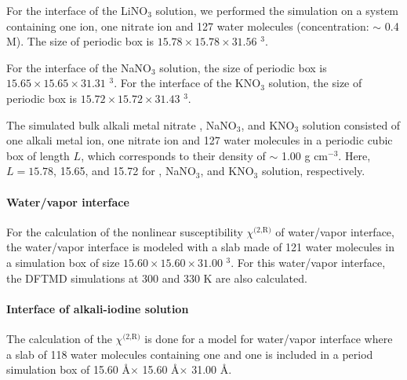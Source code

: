 For the interface of the LiNO$_3$ solution, we performed the simulation on a system containing one \Li ion, one nitrate ion 
and 127 water molecules (concentration: $\sim$ 0.4 M). 
The size of periodic box is $15.78 \times 15.78 \times 31.56$ \A$^3$.

For the interface of the NaNO$_3$ solution, the size of periodic box is $15.65 \times 15.65 \times 31.31$ \A$^3$. %
For the interface of the KNO$_3$ solution, the size of periodic box is $15.72 \times 15.72 \times 31.43$ \A$^3$. %

The simulated bulk alkali metal nitrate \LiN, NaNO$_3$, and KNO$_3$ solution consisted of one alkali metal ion, 
one nitrate ion and 127 water molecules in a periodic cubic box of length $L$, which corresponds to their density of $\sim$ 1.00 g cm$^{-3}$. 
Here, $L=15.78$, 15.65, and 15.72 for \LiN, NaNO$_3$, and KNO$_3$ solution, respectively.


\paragraph{Water/vapor interface}
For the calculation of the nonlinear susceptibility $\chi^\text{(2,R)}$ of water/vapor interface, the water/vapor interface is modeled with a slab 
made of 121 water molecules in a simulation box of size $15.60 \times 15.60 \times 31.00$ \A$^3$. 
For this water/vapor interface, the DFTMD simulations at 300 and 330 K are also calculated.

\paragraph{Interface of alkali-iodine solution}
The calculation of the $\chi^\text{(2,R)}$ is done for a model for water/vapor interface where a slab of 118 
water molecules containing one \Li and one \I is included in a period simulation box of 15.60 \AA $\times$ 15.60 \AA $\times$ 31.00 \AA.

